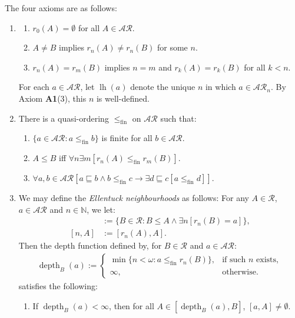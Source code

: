 \documentclass[11pt,reqno]{amsart}
\theoremstyle{plain}
\numberwithin{equation}{section}
\theoremstyle{definition}
\newcommand{\func}{\operatorname}
\newcommand{\N}{\mathbb{N}}
\newcommand{\cal}{\mathcal}
\newcommand{\lh}{\func{lh}}
\newcommand{\depth}{\func{depth}}
\newcommand{\fin}{\mathrm{fin}}
\begin{document}
The four axioms are as follows:
\begin{enumerate}
    \item[\textbf{(A1)}] 
    \begin{enumerate}[label=(\arabic*)]
        \item $r_0(A) = \emptyset$ for all $A \in \cal{AR}$.

        \item $A \neq B$ implies $r_n(A) \neq r_n(B)$ for some $n$.

        \item $r_n(A) = r_m(B)$ implies $n = m$ and $r_k(A) = r_k(B)$ for all $k < n$.
    \end{enumerate}
    For each $a \in \cal{AR}$, let $\lh(a)$ denote the unique $n$ in which $a \in \cal{AR}_n$. By Axiom \textbf{A1}(3), this $n$ is well-defined.

    \item[\textbf{(A2)}]  There is a quasi-ordering $\leq_\fin$ on $\cal{AR}$ such that:
    \begin{enumerate}[label=(\arabic*)]
        \item $\{a \in \cal{AR} : a \leq_\fin b\}$ is finite for all $b \in \cal{AR}$.

        \item $A \leq B$ iff $\forall n \exists m [r_n(A) \leq_\fin r_m(B)]$.

        \item $\forall a,b \in \cal{AR}[a \sqsubseteq b \wedge b \leq_\fin c \to \exists d \sqsubseteq c[a \leq_\fin d]]$.
    \end{enumerate}

    \item[\textbf{(A3)}] We may define the \emph{Ellentuck neighbourhoods} as follows: For any $A \in \cal{R}$, $a \in \cal{AR}$ and $n \in \N$, we let:
    \begin{align*}
        [a,A] &:= \{B \in \cal{R} : B \leq A \wedge \exists n[r_n(B) = a]\}, \\
        [n,A] &:= [r_n(A),A].
    \end{align*}
    Then the depth function defined by, for $B \in \cal{R}$ and $a \in \cal{AR}$:
    \begin{align*}
        \depth_B(a) := 
        \begin{cases}
            \min\{n < \omega : a \leq_\fin r_n(B)\}, &\text{if such $n$ exists}, \\
            \infty, &\text{otherwise}.
        \end{cases}
    \end{align*}
    satisfies the following:
    \begin{enumerate}[label=(\arabic*)]
        \item If $\depth_B(a) < \infty$, then for all $A \in [\depth_B(a),B]$, $[a,A] \neq \emptyset$.


\end{enumerate}
\end{enumerate}
\end{document}

